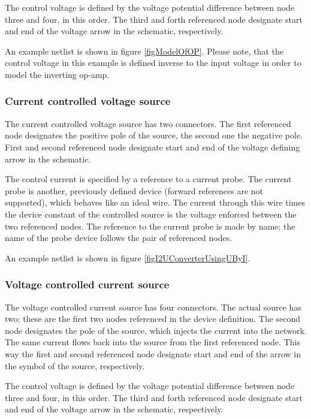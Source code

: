 The control voltage is defined by the voltage potential difference between
node three and four, in this order. The third and forth referenced node
designate start and end of the voltage arrow in the schematic,
respectively.

An example netlist is shown in figure \ref{figModelOfOP}. Please note,
that the control voltage in this example is defined inverse to the input
voltage in order to model the inverting op-amp.


\subsubsection{Current controlled voltage source }

The current controlled voltage source  has two connectors. The
first referenced node designates the positive pole of the source, the
second one the negative pole. First and second referenced
node designate start and end of the voltage defining arrow in the
schematic.

The control current is specified by a reference to a current probe. The
current probe is another, previously defined device (forward references
are not supported), which behaves like an ideal wire. The current through
this wire times the device constant of the controlled source is the
voltage enforced between the two referenced nodes. The reference to the
current probe is made by name; the name of the probe device follows the
pair of referenced nodes.

An example netlist is shown in figure \ref{figI2UConverterUsingUByI}.


\subsubsection{Voltage controlled current source }

The voltage controlled current source  has four connectors. The
actual source has two; these are the first two nodes referenced in the
device definition. The second node designates the pole of the source,
which injects the current into the network. The same current flows back
into the source from the first referenced node. This way the first and
second referenced node designate start and end of the arrow in the symbol
of the source, respectively.

The control voltage is defined by the voltage potential difference between
node three and four, in this order. The third and forth referenced node
designate start and end of the voltage arrow in the schematic,
respectively.

